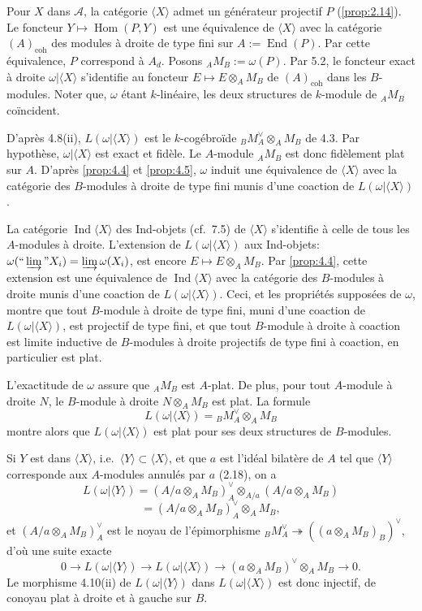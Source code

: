 \documentclass[12pt,a4paper]{article}
\theoremstyle{plain}
\theoremstyle{definition}
\theoremstyle{remark}
\DeclareMathOperator{\Hom}{Hom}
\DeclareMathOperator{\End}{End}
\DeclareMathOperator{\Ind}{Ind}
\begin{document}
Pour $X$ dans $\mathcal{A}$, la catégorie $\langle X \rangle$ admet un générateur projectif $P$ (\ref{prop:2.14}). Le foncteur $Y \mapsto \Hom(P,Y)$ est une équivalence de $\langle X \rangle$ avec la catégorie $(A)_\mathrm{coh}$ des modules à droite de type fini sur $A := \End(P)$. Par cette équivalence, $P$ correspond à $A_d$. Posons ${}_A M_B := \omega(P)$. Par 5.2, le foncteur exact à droite $\omega|\langle X \rangle$ s'identifie au foncteur $E \mapsto E \otimes_A M_B$ de $(A)_\mathrm{coh}$ dans les $B$-modules. Noter que, $\omega$ étant $k$-linéaire, les deux structures de $k$-module de ${}_A M_B$ coïncident.

D'après 4.8(ii), $L(\omega|\langle X \rangle)$ est le $k$-cogébroïde ${}_B M_A^\vee \otimes_A M_B$ de 4.3. Par hypothèse, $\omega|\langle X \rangle$ est exact et fidèle. Le $A$-module ${}_A M_B$ est donc fidèlement plat sur $A$. D'après \ref{prop:4.4} et \ref{prop:4.5}, $\omega$ induit une équivalence de $\langle X \rangle$ avec la catégorie des $B$-modules à droite de type fini munis d'une coaction de $L(\omega|\langle X \rangle)$.

La catégorie $\Ind\langle X \rangle$ des Ind-objets (cf.~7.5) de $\langle X \rangle$ s'identifie à celle de tous les $A$-modules à droite. L'extension de $L(\omega|\langle X \rangle)$ aux Ind-objets: $\omega(``\varinjlim" X_i) = \varinjlim \omega(X_i)$, est encore $E \mapsto E \otimes_A M_B$. Par \ref{prop:4.4}, cette extension est une équivalence de $\Ind\langle X \rangle$ avec la catégorie des $B$-modules à droite munis d'une coaction de $L(\omega|\langle X \rangle)$. Ceci, et les propriétés supposées de $\omega$, montre que tout $B$-module à droite de type fini, muni d'une coaction de $L(\omega|\langle X \rangle)$, est projectif de type fini, et que tout $B$-module à droite à coaction est limite inductive de $B$-modules à droite projectifs de type fini à coaction, en particulier est plat.

L'exactitude de $\omega$ assure que ${}_A M_B$ est $A$-plat. De plus, pour tout $A$-module à droite $N$, le $B$-module à droite $N \otimes_A M_B$ est plat. La formule
\[
L(\omega|\langle X \rangle) = {}_B M_A^\vee \otimes_A M_B
\]
montre alors que $L(\omega|\langle X \rangle)$ est plat pour ses deux structures de $B$-modules.

Si $Y$ est dans $\langle X \rangle$, i.e.~$\langle Y \rangle \subset \langle X \rangle$, et que $a$ est l'idéal bilatère de $A$ tel que $\langle Y \rangle$ corresponde aux $A$-modules annulés par $a$ (2.18), on a
\[
L(\omega|\langle Y \rangle) = (A/a \otimes_A M_B)_A^\vee \otimes_{A/a} (A/a \otimes_A M_B)
\]
\[
= (A/a \otimes_A M_B)_A^\vee \otimes_A M_B,
\]
et $(A/a \otimes_A M_B)_A^\vee$ est le noyau de l'épimorphisme ${}_B M_A^\vee \twoheadrightarrow ((a \otimes_A M_B)_B)^\vee$, d'où une suite exacte
\[
0 \to L(\omega|\langle Y \rangle) \to L(\omega|\langle X \rangle) \to (a \otimes_A M_B)^\vee \otimes_A M_B \to 0.
\]
Le morphisme 4.10(ii) de $L(\omega|\langle Y \rangle)$ dans $L(\omega|\langle X \rangle)$ est donc injectif, de conoyau plat à droite et à gauche sur $B$.
\end{document}
